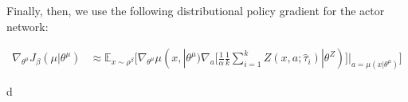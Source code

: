 Finally, then, we use the following distributional policy gradient for the actor network:

\begin{align}
    \nabla_{\theta^\mu} J_\beta(\mu | \theta^\mu) &\approx \mathbb E_{x \sim \rho^\beta} 
    \big [\nabla_{\theta^\mu} \mu(x,| \theta^\mu) \nabla_a  [\frac{1}{\alpha} \frac{1}{k}\sum_{i=1}^kZ(x,a; \hat\tau_i) | \theta^Z)]|_{a=\mu(x| \theta^\mu)}  \big]
    \label{eq:actor_grad}
\end{align}

d



















